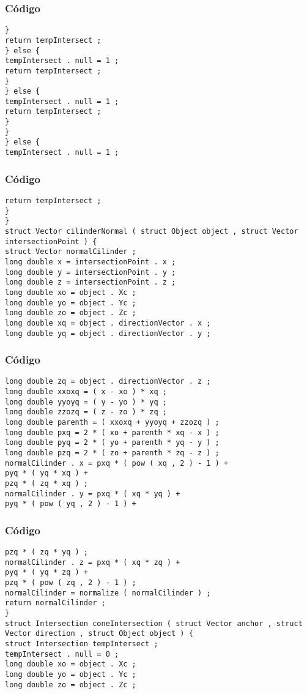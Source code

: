 \documentclass{beamer}
\begin{document}
\begin{frame}[fragile]
\frametitle{C\'odigo}
\begin{verbatim}
} 
return tempIntersect ; 
} else { 
tempIntersect . null = 1 ; 
return tempIntersect ; 
} 
} else { 
tempIntersect . null = 1 ; 
return tempIntersect ; 
} 
} 
} else { 
tempIntersect . null = 1 ; 
\end{verbatim}
\end{frame}
\begin{frame}[fragile]
\frametitle{C\'odigo}
\begin{verbatim}
return tempIntersect ; 
} 
} 
struct Vector cilinderNormal ( struct Object object , struct Vector intersectionPoint ) { 
struct Vector normalCilinder ; 
long double x = intersectionPoint . x ; 
long double y = intersectionPoint . y ; 
long double z = intersectionPoint . z ; 
long double xo = object . Xc ; 
long double yo = object . Yc ; 
long double zo = object . Zc ; 
long double xq = object . directionVector . x ; 
long double yq = object . directionVector . y ; 
\end{verbatim}
\end{frame}
\begin{frame}[fragile]
\frametitle{C\'odigo}
\begin{verbatim}
long double zq = object . directionVector . z ; 
long double xxoxq = ( x - xo ) * xq ; 
long double yyoyq = ( y - yo ) * yq ; 
long double zzozq = ( z - zo ) * zq ; 
long double parenth = ( xxoxq + yyoyq + zzozq ) ; 
long double pxq = 2 * ( xo + parenth * xq - x ) ; 
long double pyq = 2 * ( yo + parenth * yq - y ) ; 
long double pzq = 2 * ( zo + parenth * zq - z ) ; 
normalCilinder . x = pxq * ( pow ( xq , 2 ) - 1 ) + 
pyq * ( yq * xq ) + 
pzq * ( zq * xq ) ; 
normalCilinder . y = pxq * ( xq * yq ) + 
pyq * ( pow ( yq , 2 ) - 1 ) + 
\end{verbatim}
\end{frame}
\begin{frame}[fragile]
\frametitle{C\'odigo}
\begin{verbatim}
pzq * ( zq * yq ) ; 
normalCilinder . z = pxq * ( xq * zq ) + 
pyq * ( yq * zq ) + 
pzq * ( pow ( zq , 2 ) - 1 ) ; 
normalCilinder = normalize ( normalCilinder ) ; 
return normalCilinder ; 
} 
struct Intersection coneIntersection ( struct Vector anchor , struct Vector direction , struct Object object ) { 
struct Intersection tempIntersect ; 
tempIntersect . null = 0 ; 
long double xo = object . Xc ; 
long double yo = object . Yc ; 
long double zo = object . Zc ; 
\end{verbatim}
\end{frame}
\end{document}
